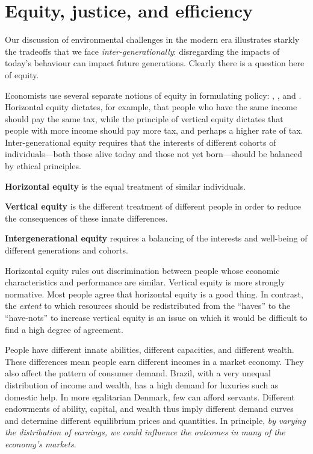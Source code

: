 \section{Equity, justice, and efficiency}\label{sec:ch5sec8}

Our discussion of environmental challenges in the modern era illustrates starkly the tradeoffs that we face \textit{inter-generationally}: disregarding the impacts of today's behaviour can impact future generations. Clearly there is a question here of equity. 

Economists use several separate notions of equity in formulating policy: , , and . Horizontal equity dictates, for example, that people who have the same income should pay the same tax, while the principle of vertical equity dictates that people with more income should pay more tax, and perhaps a higher rate of tax. Inter-generational equity requires that the interests of different cohorts of individuals---both those alive today and those not yet born---should be balanced by ethical principles.

\begin{DefBox}
\textbf{Horizontal equity} is the equal treatment of similar individuals.

\textbf{Vertical equity} is the different treatment of different people in order to reduce the consequences of these innate differences.

\textbf{Intergenerational equity} requires a balancing of the interests and well-being of different generations and cohorts.
\end{DefBox}

Horizontal equity rules out discrimination between people whose economic characteristics and performance are similar. Vertical equity is more strongly normative. Most people agree that horizontal equity is a good thing. In contrast, the \textit{extent} to which resources should be redistributed from the ``haves'' to the ``have-nots'' to increase vertical equity is an issue on which it would be difficult to find a high degree of agreement. 

People have different innate abilities, different capacities, and different wealth. These differences mean people earn different incomes in a market economy. They also affect the pattern of consumer demand. Brazil, with a very unequal distribution of income and wealth, has a high demand for luxuries such as domestic help. In more egalitarian Denmark, few can afford servants. Different endowments of ability, capital, and wealth thus imply different demand curves and determine different equilibrium prices and quantities. In principle, \textit{by varying the distribution of earnings, we could influence the outcomes in many of the economy's markets}.

